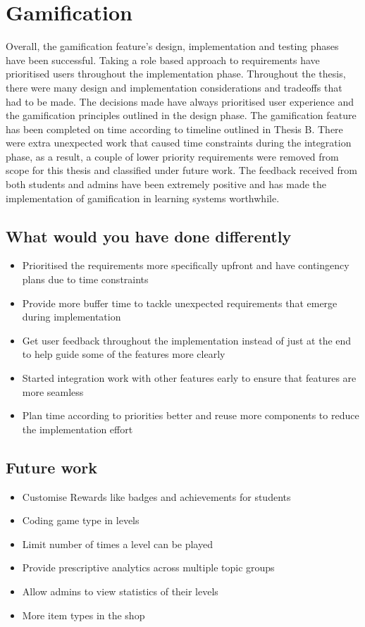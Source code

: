 \section{Gamification}

Overall, the gamification feature's design, implementation and testing phases have been successful. Taking a role based approach to requirements have prioritised users throughout the implementation phase. Throughout the thesis, there were many design and implementation considerations and tradeoffs that had to be made. The decisions made have always prioritised user experience and the gamification principles outlined in the design phase. The gamification feature has been completed on time according to timeline outlined in Thesis B. There were extra unexpected work that caused time constraints during the integration phase, as a result, a couple of lower priority requirements were removed from scope for this thesis and classified under future work. The feedback received from both students and admins have been extremely positive and has made the implementation of gamification in learning systems worthwhile.

\subsection{What would you have done differently}
\begin{itemize}
  \item Prioritised the requirements more specifically upfront and have contingency plans due to time constraints
  \item Provide more buffer time to tackle unexpected requirements that emerge during implementation
  \item Get user feedback throughout the implementation instead of just at the end to help guide some of the features more clearly
  \item Started integration work with other features early to ensure that features are more seamless
  \item Plan time according to priorities better and reuse more components to reduce the implementation effort
\end{itemize}


\subsection{Future work}
\begin{itemize}
  \item Customise Rewards like badges and achievements for students
  \item Coding game type in levels
  \item Limit number of times a level can be played
  \item Provide prescriptive analytics across multiple topic groups
  \item Allow admins to view statistics of their levels
  \item More item types in the shop
\end{itemize}